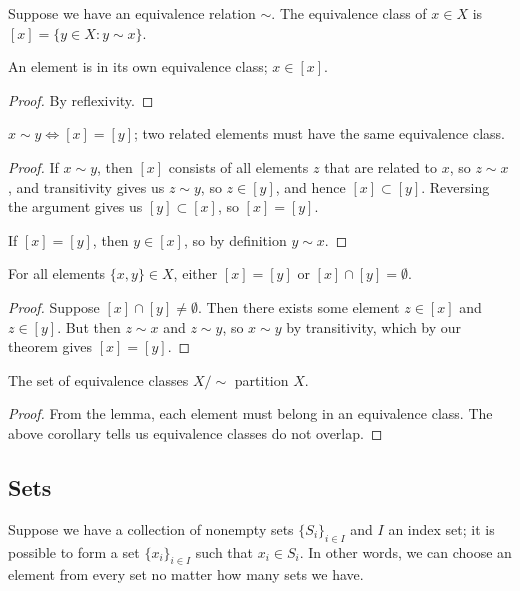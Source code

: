\begin{definition}
    Suppose we have an equivalence relation \(\sim\).
    The equivalence class of \(x \in X\) is
    \([x] = \{y \in X : y \sim x\}\).
\end{definition}
\begin{lemma}
    An element is in its own equivalence class; \(x \in [x]\).
\end{lemma}
\begin{proof}
    By reflexivity.
\end{proof}
\begin{theorem}
    \(x \sim y \iff [x] = [y]\);
    two related elements must have the same equivalence class.
\end{theorem}
\begin{proof}
    If \(x \sim y\),
    then \([x]\) consists of all elements \(z\) that are related to \(x\),
    so \(z \sim x\), and transitivity gives us \(z \sim y\),
    so \(z \in [y]\), and hence \([x] \subset [y]\).
    Reversing the argument gives us \([y] \subset [x]\),
    so \([x] = [y]\).

    If \([x] = [y]\), then \(y \in [x]\),
    so by definition \(y \sim x\).
\end{proof}
\begin{corollary}
    For all elements \(\{x,y\} \in X\),
    either \([x] = [y]\) or \([x] \cap [y] = \emptyset\).
\end{corollary}
\begin{proof}
    Suppose \([x] \cap [y] \neq \emptyset\).
    Then there exists some element \(z \in [x]\) and \(z \in [y]\).
    But then \(z \sim x\) and \(z \sim y\),
    so \(x \sim y\) by transitivity,
    which by our theorem gives \([x] = [y]\).
\end{proof}

\begin{theorem}\label{thm:equiv-class-partition}
    The set of equivalence classes \(X/{\sim}\) partition \(X\).
\end{theorem}
\begin{proof}
    From the lemma,
    each element must belong in an equivalence class.
    The above corollary tells us equivalence classes do not overlap.
\end{proof}


\subsection{Sets}

\begin{axiom}\label{ax:choice}
    Suppose we have a collection of nonempty sets \({\{S_i\}}_{i \in I}\)
    and \(I\) an index set;
    it is possible to form a set \({\{x_i\}}_{i \in I}\)
    such that \(x_i \in S_i\).
    In other words,
    we can choose an element from every set
    no matter how many sets we have.
\end{axiom}

